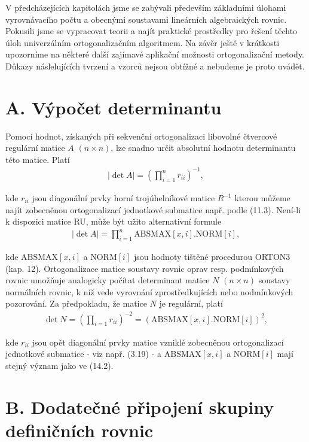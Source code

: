 
V předcházejících  kapitolách jsme se zabývali především
základními úlohami vyrovnávacího počtu a obecnými soustavami
lineárních algebraických rovnic. Pokusili jsme se vypracovat
teorii a najít praktické prostředky pro řešení těchto úloh
univerzálním ortogonalizačním algoritmem. Na závěr ještě v krátkosti
upozorníme na některé další zajímavé aplikační možnosti
ortogonalizační metody. Důkazy náslelujících tvrzení a vzorců nejsou
obtížné a nebudeme je proto uvádět.

\section*{A. Výpočet determinantu}

Pomocí hodnot, získaných při sekvenční ortogonalizaci
libovolné čtvercové regulární matice $A$ $(n \times n)$, lze snadno určit
absolutní hodnotu determinantu této matice. Platí
%
\begin{align*}
  \tag{14.1}
  |\det A| = (\prod_{i=1}^n r_{ii})^{-1}{,}
\end{align*}

\noindent
kde $r_{ii}$ jsou diagonální prvky horní trojúhelníkové matice $R^{-1}$
kterou můžeme najít zobecněnou ortogonalizací jednotkové submatice
např. podle (11.3). Není-li k dispozici matice RU, může být užito
alternativní formule
%
\begin{align*}
  \tag{14.2}
  |\det A| = \prod_{i=1}^n \textrm{ABSMAX} [x,i].\textrm{NORM}[i],
\end{align*}

\noindent
kde $\textrm{ABSMAX}[x,i]$ a $\textrm{NORM}[i]$ jsou hodnoty
tištěné procedurou ORTON3 (kap. 12). Ortogonalizace matice soustavy
rovnic oprav resp. podmínkových rovnic umožňuje analogicky počítat
determinant matice $N$ $(n \times n)$ soustavy normálních rovnic, k
níž vede vyrovnání zprostředkujících nebo nodmínkových pozorování.  Za
předpokladu, že matice $N$ je regulární, platí
%
\begin{align*}
  \tag{14.3}
  \det N = (\prod_{i=1} r_{ii})^{-2}
  = (\textrm{ABSMAX} [x,i].\textrm{NORM}[i])^2,
\end{align*}

\noindent
kde $r_{ii}$ jsou opět diagonální prvky matice vzniklé zobecněnou
ortogonalizací jednotkové submatice - viz např. (3.19) -
a $\textrm{ABSMAX}[x,i]$ a $\textrm{NORM}[i]$ mají stejný význam jako
ve (14.2).

\section*{B. Dodatečné připojení skupiny definičních rovnic}

